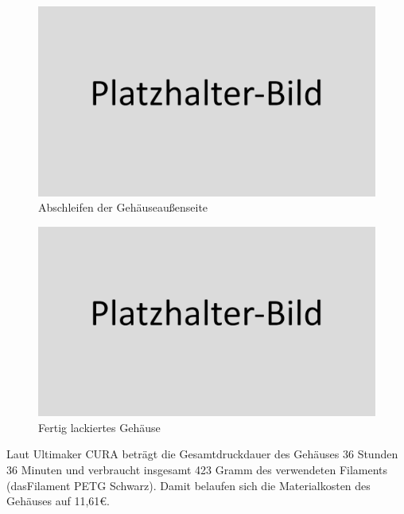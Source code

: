 \begin{figure}[h!tb]
	\includegraphics[width=1\textwidth]{img/placeholder.png}
	\caption[Abschleifen der Gehäuseaußenseite]{Abschleifen der Gehäuseaußenseite}
	\label{fig:filed_parts}
\end{figure}
\begin{figure}[h!tb]
	\includegraphics[width=1\textwidth]{img/placeholder.png}
	\caption[Fertig lackiertes Gehäuse]{Fertig lackiertes Gehäuse}
	\label{fig:finished_parts}
\end{figure}
Laut Ultimaker CURA beträgt die Gesamtdruckdauer des Gehäuses 36 Stunden 36 Minuten und verbraucht insgesamt 423 Gramm des verwendeten Filaments (dasFilament PETG Schwarz). Damit belaufen sich die Materialkosten des Gehäuses auf 11,61\euro{}.
\newpage